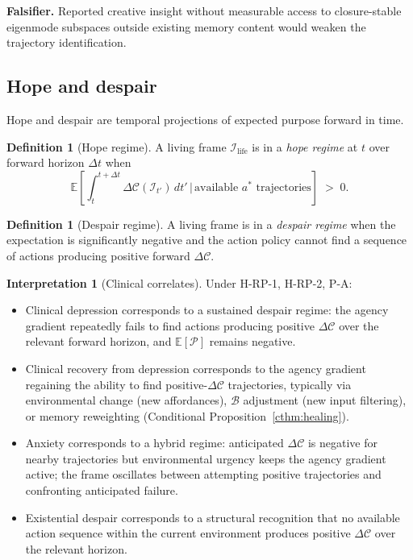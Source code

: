 \documentclass[11pt]{article}
\theoremstyle{plain}
\theoremstyle{definition}
\newtheorem{definition}[theorem]{Definition}
\newtheorem{interpretation}[theorem]{Interpretation}
\theoremstyle{remark}
\newcommand{\Ical}{\mathcal{I}}
\newcommand{\Ccal}{\mathcal{C}}
\newcommand{\Bcal}{\mathcal{B}}
\newcommand{\Pcal}{\mathcal{P}}
\newcommand{\Ilife}{\Ical_{\mathrm{life}}}
\begin{document}
\textbf{Falsifier.} Reported creative insight without measurable access to closure-stable eigenmode subspaces outside existing memory content would weaken the trajectory identification.

\subsection{Hope and despair}\label{sec:hope-despair}

Hope and despair are temporal projections of expected purpose forward in time.

\begin{definition}[Hope regime]\label{def:hope}
A living frame $\Ilife$ is in a \emph{hope regime} at $t$ over forward horizon $\Delta t$ when
\[
  \mathbb{E}\!\left[ \int_t^{t + \Delta t} \Delta \Ccal(\Ical_{t'}) \, dt' \,\Big|\, \text{available } a^* \text{ trajectories} \right] \;>\; 0.
\]
\end{definition}

\begin{definition}[Despair regime]\label{def:despair}
A living frame is in a \emph{despair regime} when the expectation is significantly negative and the action policy cannot find a sequence of actions producing positive forward $\Delta \Ccal$.
\end{definition}

\begin{interpretation}[Clinical correlates]\label{int:hope-despair}
Under H-RP-1, H-RP-2, P-A:
\begin{itemize}[leftmargin=2em]
\item Clinical depression corresponds to a sustained despair regime: the agency gradient repeatedly fails to find actions producing positive $\Delta \Ccal$ over the relevant forward horizon, and $\mathbb{E}[\Pcal]$ remains negative.
\item Clinical recovery from depression corresponds to the agency gradient regaining the ability to find positive-$\Delta \Ccal$ trajectories, typically via environmental change (new affordances), $\Bcal$ adjustment (new input filtering), or memory reweighting (Conditional Proposition~\ref{cthm:healing}).
\item Anxiety corresponds to a hybrid regime: anticipated $\Delta \Ccal$ is negative for nearby trajectories but environmental urgency keeps the agency gradient active; the frame oscillates between attempting positive trajectories and confronting anticipated failure.
\item Existential despair corresponds to a structural recognition that no available action sequence within the current environment produces positive $\Delta \Ccal$ over the relevant horizon.
\end{itemize}
\end{interpretation}
\end{document}
